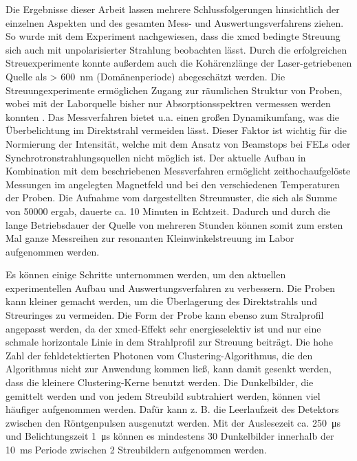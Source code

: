 \noindent
Die Ergebnisse dieser Arbeit lassen mehrere Schlussfolgerungen hinsichtlich der einzelnen Aspekten und des gesamten Mess- und Auswertungsverfahrens ziehen. So wurde mit dem Experiment nachgewiesen, dass die \gls{xmcd} bedingte Streuung sich auch mit unpolarisierter Strahlung beobachten lässt. Durch die erfolgreichen Streuexperimente konnte außerdem auch die Kohärenzlänge der Laser-getriebenen Quelle als > \SI{600}{\nano\meter} (Domänenperiode) abegeschätzt werden. Die Streuungexperimente ermöglichen Zugang zur räumlichen Struktur von Proben, wobei mit der Laborquelle bisher nur Absorptionsspektren vermessen werden konnten \cite{schick_laser-driven_2021}. Das Messverfahren bietet u.a. einen großen Dynamikumfang, was die Überbelichtung im Direktstrahl vermeiden lässt. Dieser Faktor ist wichtig für die Normierung der Intensität, welche mit dem Ansatz von Beamstops bei FELs oder Synchrotronstrahlungsquellen nicht möglich ist. Der aktuelle Aufbau in Kombination mit dem beschriebenen Messverfahren ermöglicht zeithochaufgelöste Messungen im angelegten Magnetfeld und bei den verschiedenen Temperaturen der Proben. Die Aufnahme vom dargestellten Streumuster, die sich als Summe von \SI{50000}{\captures} ergab, dauerte ca. 10 Minuten in Echtzeit. Dadurch und durch die lange Betriebsdauer der Quelle von mehreren Stunden können somit zum ersten Mal ganze Messreihen zur resonanten Kleinwinkelstreuung im Labor aufgenommen werden.

\noindent
Es können einige Schritte unternommen werden, um den aktuellen experimentellen Aufbau und Auswertungsverfahren zu verbessern. Die Proben kann kleiner gemacht werden, um die Überlagerung des Direktstrahls und Streuringes zu vermeiden. Die Form der Probe kann ebenso zum Stralprofil angepasst werden, da der \gls{xmcd}-Effekt sehr energieselektiv ist und nur eine schmale horizontale Linie in dem Strahlprofil zur Streuung beiträgt. Die hohe Zahl der fehldetektierten Photonen vom Clustering-Algorithmus, die den Algorithmus nicht zur Anwendung kommen ließ, kann damit gesenkt werden, dass die kleinere Clustering-Kerne benutzt werden. Die Dunkelbilder, die gemittelt werden und von jedem Streubild subtrahiert werden, können viel häufiger aufgenommen werden. Dafür kann z. B. die Leerlaufzeit des Detektors zwischen den Röntgenpulsen ausgenutzt werden. Mit der Auslesezeit ca. \SI{250}{\micro\second} und Belichtungszeit \SI{1}{\micro\second} können es mindestens 30 Dunkelbilder innerhalb der \SI{10}{\milli\second} Periode zwischen 2 Streubildern aufgenommen werden.

